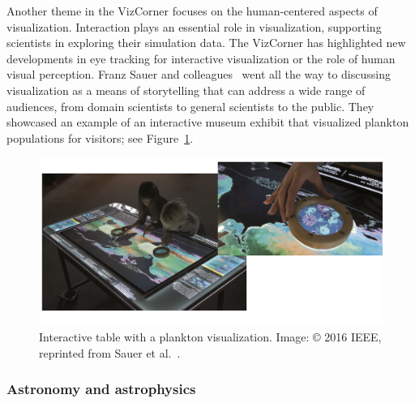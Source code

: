 \documentclass[10pt,journal,compsoc]{IEEEtran}
\begin{document}
Another theme in the VizCorner focuses on the human-centered aspects of visualization. Interaction plays an essential role in visualization, supporting scientists in exploring their simulation data. The VizCorner has highlighted new developments in eye tracking for interactive visualization or the role of human visual perception. Franz Sauer and colleagues~\cite{Sauer2016} went all the way to discussing visualization as a means of storytelling that can address a wide range of audiences, from domain scientists to general scientists to the public. They showcased an example of an interactive museum exhibit that visualized plankton populations for visitors; see Figure~\ref{fig:museum}.

\begin{figure}
    \begin{center}    
        \includegraphics[width=\textwidth]{museum.png} 
        \caption{Interactive table with a plankton visualization. Image: \copyright{} 2016 IEEE, reprinted from Sauer et al.~\cite{Sauer2016}. 
  \label{fig:museum}}        
    \end{center}
\end{figure}



\subsubsection*{Astronomy and astrophysics}

\end{document}
